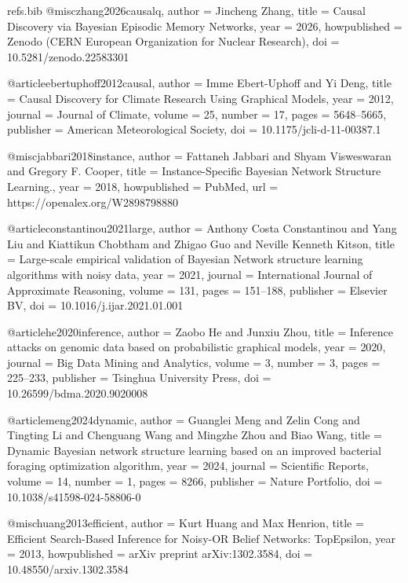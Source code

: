 \begin{filecontents*}[overwrite]{refs.bib}
@misc{zhang2026causalq,
  author = {Jincheng Zhang},
  title = {{Causal Discovery via Bayesian Episodic Memory Networks}},
  year = {2026},
  howpublished = {Zenodo (CERN European Organization for Nuclear Research)},
  doi = {10.5281/zenodo.22583301}
}

@article{ebertuphoff2012causal,
  author = {Imme Ebert{-}Uphoff and Yi Deng},
  title = {{Causal Discovery for Climate Research Using Graphical Models}},
  year = {2012},
  journal = {Journal of Climate},
  volume = {25},
  number = {17},
  pages = {5648--5665},
  publisher = {American Meteorological Society},
  doi = {10.1175/jcli-d-11-00387.1}
}

@misc{jabbari2018instance,
  author = {Fattaneh Jabbari and Shyam Visweswaran and Gregory F. Cooper},
  title = {{Instance-Specific Bayesian Network Structure Learning.}},
  year = {2018},
  howpublished = {PubMed},
  url = {https://openalex.org/W2898798880}
}

@article{constantinou2021large,
  author = {Anthony Costa Constantinou and Yang Liu and Kiattikun Chobtham and Zhigao Guo and Neville  Kenneth Kitson},
  title = {{Large-scale empirical validation of Bayesian Network structure learning algorithms with noisy data}},
  year = {2021},
  journal = {International Journal of Approximate Reasoning},
  volume = {131},
  pages = {151--188},
  publisher = {Elsevier BV},
  doi = {10.1016/j.ijar.2021.01.001}
}

@article{he2020inference,
  author = {Zaobo He and Junxiu Zhou},
  title = {{Inference attacks on genomic data based on probabilistic graphical models}},
  year = {2020},
  journal = {Big Data Mining and Analytics},
  volume = {3},
  number = {3},
  pages = {225--233},
  publisher = {Tsinghua University Press},
  doi = {10.26599/bdma.2020.9020008}
}

@article{meng2024dynamic,
  author = {Guanglei Meng and Zelin Cong and Tingting Li and Chenguang Wang and Mingzhe Zhou and Biao Wang},
  title = {{Dynamic Bayesian network structure learning based on an improved bacterial foraging optimization algorithm}},
  year = {2024},
  journal = {Scientific Reports},
  volume = {14},
  number = {1},
  pages = {8266},
  publisher = {Nature Portfolio},
  doi = {10.1038/s41598-024-58806-0}
}

@misc{huang2013efficient,
  author = {Kurt Huang and Max Henrion},
  title = {{Efficient Search-Based Inference for Noisy-OR Belief Networks: TopEpsilon}},
  year = {2013},
  howpublished = {arXiv preprint arXiv:1302.3584},
  doi = {10.48550/arxiv.1302.3584}
}


\end{filecontents*}
